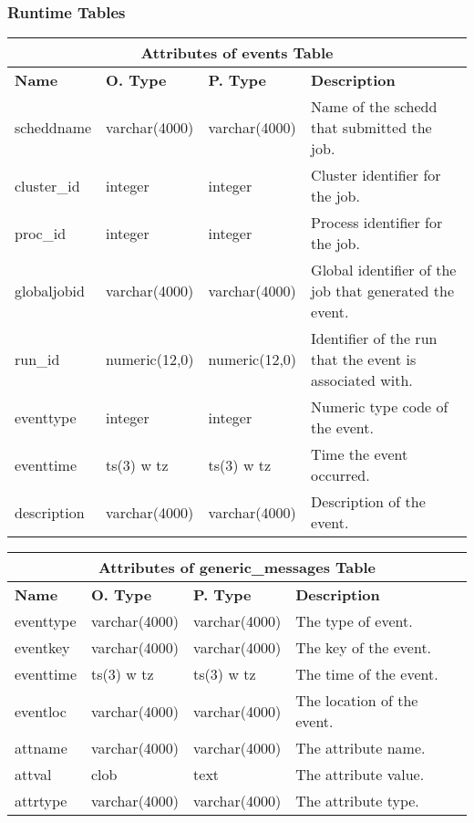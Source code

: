 \subsubsection{Runtime Tables}
\begin{center}
  \begin{tabular}{|l|l|l|p{3.2in}|}\hline
    \multicolumn{4}{|c|}{\textbf{Attributes of events Table}}\\ \hline
    \textbf{Name} & \textbf{O. Type} & \textbf{P. Type} & \textbf{Description}\\ \hline
    scheddname & varchar(4000) & varchar(4000) & Name of the schedd that submitted the job.\\ \hline
    cluster\_id & integer & integer & Cluster identifier for the job.\\ \hline
    proc\_id & integer & integer & Process identifier for the job.\\ \hline
    globaljobid & varchar(4000) & varchar(4000) & Global identifier of the job that generated the event.\\ \hline
    run\_id & numeric(12,0) & numeric(12,0) & Identifier of the run that the event is associated with.\\ \hline
    eventtype & integer & integer & Numeric type code of the event.\\ \hline
    eventtime & ts(3) w tz & ts(3) w tz & Time the event occurred.\\ \hline
    description & varchar(4000) & varchar(4000) & Description of the event.\\ \hline
  \end{tabular}
\vspace{24pt}

  \begin{tabular}{|l|l|l|p{3.3in}|}\hline
    \multicolumn{4}{|c|}{\textbf{Attributes of generic\_messages Table}}\\ \hline
    \textbf{Name} & \textbf{O. Type} & \textbf{P. Type} & \textbf{Description}\\ \hline
    eventtype & varchar(4000) & varchar(4000) & The type of event.\\ \hline
    eventkey & varchar(4000) & varchar(4000) & The key of the event.\\ \hline
    eventtime & ts(3) w tz & ts(3) w tz & The time of the event.\\ \hline
    eventloc & varchar(4000) & varchar(4000) & The location of the event.\\ \hline
    attname & varchar(4000) & varchar(4000) & The attribute name.\\ \hline
    attval & clob & text & The attribute value.\\ \hline
    attrtype & varchar(4000) & varchar(4000) & The attribute type.\\ \hline
  \end{tabular}
\vspace{24pt}


\end{center}
